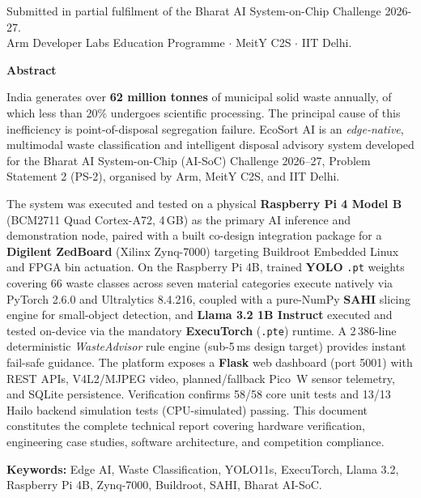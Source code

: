 \documentclass[12pt,a4paper]{article}
\begin{document}
\begin{titlepage}
\vfill
{\small\color{ecosortgray}
  Submitted in partial fulfilment of the Bharat AI System-on-Chip Challenge 2026-27.\\
  Arm Developer Labs Education Programme $\cdot$ MeitY C2S $\cdot$ IIT Delhi.
}
\end{titlepage}

\newpage
\thispagestyle{fancy}
\begin{center}
  {\large\bfseries\color{ecosortblue} Abstract}
\end{center}
\vspace{4pt}
\noindent
India generates over \textbf{62 million tonnes} of municipal solid waste annually, of which
less than 20\% undergoes scientific processing. The principal cause of this inefficiency is
point-of-disposal segregation failure. EcoSort AI is an \textit{edge-native}, multimodal
waste classification and intelligent disposal advisory system developed for the Bharat
AI System-on-Chip (AI-SoC) Challenge 2026--27, Problem Statement 2 (PS-2), organised by
Arm, MeitY C2S, and IIT Delhi.

The system was executed and tested on a physical \textbf{Raspberry Pi 4 Model B} (BCM2711
Quad Cortex-A72, 4\,GB) as the primary AI inference and demonstration node, paired with a
built co-design integration package for a \textbf{Digilent ZedBoard} (Xilinx Zynq-7000)
targeting Buildroot Embedded Linux and FPGA bin actuation. On the Raspberry Pi 4B, trained
\textbf{YOLO} \texttt{.pt} weights covering 66 waste classes across seven material categories
execute natively via PyTorch 2.6.0 and Ultralytics 8.4.216, coupled with a pure-NumPy
\textbf{SAHI} slicing engine for small-object detection, and \textbf{Llama 3.2 1B Instruct}
executed and tested on-device via the mandatory \textbf{ExecuTorch} (\texttt{.pte}) runtime.
A 2\,386-line deterministic \textit{WasteAdvisor} rule engine (sub-5\,ms design target)
provides instant fail-safe guidance. The platform exposes a \textbf{Flask} web dashboard
(port 5001) with REST APIs, V4L2/MJPEG video, planned/fallback Pico~W sensor telemetry, and
SQLite persistence. Verification confirms 58/58 core unit tests and 13/13 Hailo backend
simulation tests (CPU-simulated) passing. This document constitutes the complete technical report covering
hardware verification, engineering case studies, software architecture, and competition
compliance.

\vspace{10pt}
\noindent\textbf{Keywords:} Edge AI, Waste Classification, YOLO11s, ExecuTorch, Llama 3.2,
Raspberry Pi 4B, Zynq-7000, Buildroot, SAHI, Bharat AI-SoC.
\end{document}

